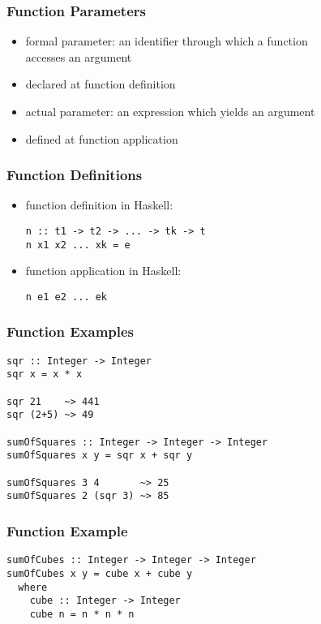\documentclass[dvipsnames]{beamer}
\theoremstyle{plain}
\begin{document}
\begin{frame}
  \frametitle{Function Parameters}

  \begin{itemize}
    \item \alert{formal parameter}: an identifier through which a function\\
      accesses an argument
    \item declared at function definition

    \pause
    \medskip
    \item \alert{actual parameter}: an expression which yields an argument
    \item defined at function application
  \end{itemize}
\end{frame}

\begin{frame}[fragile]
  \frametitle{Function Definitions}

  \begin{itemize}
    \item function definition in Haskell:
    \smallskip
    \begin{lstlisting}
n :: t1 -> t2 -> ... -> tk -> t
n x1 x2 ... xk = e
    \end{lstlisting}

    \pause
    \bigskip
    \item function application in Haskell:
    \smallskip
    \begin{lstlisting}
n e1 e2 ... ek
    \end{lstlisting}
  \end{itemize}
\end{frame}

\begin{frame}[fragile]
  \frametitle{Function Examples}

  \begin{lstlisting}
sqr :: Integer -> Integer
sqr x = x * x

sqr 21    ~> 441
sqr (2+5) ~> 49

sumOfSquares :: Integer -> Integer -> Integer
sumOfSquares x y = sqr x + sqr y

sumOfSquares 3 4       ~> 25
sumOfSquares 2 (sqr 3) ~> 85
  \end{lstlisting}
\end{frame}

\begin{frame}[fragile]
  \frametitle{Function Example}

  \begin{lstlisting}
sumOfCubes :: Integer -> Integer -> Integer
sumOfCubes x y = cube x + cube y
  where
    cube :: Integer -> Integer
    cube n = n * n * n
  \end{lstlisting}
\end{frame}
\end{document}
